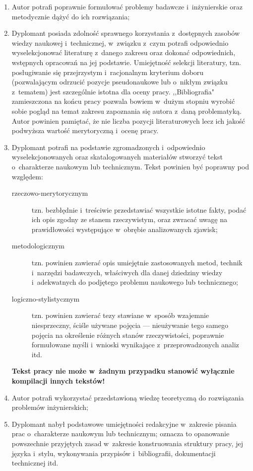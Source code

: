 \documentclass[skorowidz,skroty]{dyplomWEZUT}
\begin{document}
\begin{enumerate}

\item Autor potrafi poprawnie formułować problemy badawcze i~inżynierskie oraz metodycznie dążyć do ich rozwiązania;

\item Dyplomant posiada zdolność sprawnego korzystania z~dostępnych zasobów wiedzy naukowej i~technicznej, w~związku z~czym potrafi odpowiednio wyselekcjonować literaturę z~danego zakresu oraz dokonać odpowiednich, wstępnych opracowań na jej podstawie. Umiejętność selekcji literatury, tzn. posługiwanie się przejrzystym i~racjonalnym kryterium doboru (pozwalającym odrzucić pozycje pseudonaukowe lub o~nikłym związku
z~tematem) jest szczególnie istotna dla oceny pracy. ,,Bibliografia" zamieszczona na końcu pracy pozwala bowiem w~dużym stopniu wyrobić sobie pogląd na temat zakresu zapoznania się autora z~daną problematyką. Autor powinien pamiętać, że nie liczba pozycji literaturowych lecz ich jakość podwyższa wartość merytoryczną i~ocenę pracy.

\item Dyplomant potrafi na podstawie zgromadzonych i~odpowiednio wyselekcjonowanych oraz skatalogowanych materiałów stworzyć tekst o~charakterze naukowym lub technicznym. Tekst powinien być poprawny pod względem:

\begin{description}
\item[rzeczowo-merytorycznym] tzn. bezbłędnie i~treściwie przedstawiać wszystkie istotne fakty, podać ich opis zgodny ze stanem rzeczywistym, oraz zwracać uwagę na prawidłowości występujące w~obrębie analizowanych zjawisk;
\item[metodologicznym] tzn. powinien zawierać opis umiejętnie zastosowanych metod, technik i~narzędzi badawczych, właściwych dla danej dziedziny wiedzy i~adekwatnych do podjętego problemu naukowego lub technicznego;
\item[logiczno-stylistycznym] tzn. powinien zawierać tezy stawiane w~sposób wzajemnie niesprzeczny, ściśle używane pojęcia --- nieużywanie tego samego pojęcia na określenie różnych stanów rzeczywistości, poprawnie formułowane myśli i~wnioski wynikające z~przeprowadzonych analiz itd.
\end{description}

\textbf{Tekst pracy nie może w~żadnym przypadku stanowić wyłącznie kompilacji innych tekstów!}

\item Autor potrafi wykorzystać przedstawioną wiedzę teoretyczną do rozwiązania problemów inżynierskich;

\item Dyplomant nabył podstawowe umiejętności redakcyjne w~zakresie pisania prac o~charakterze naukowym lub technicznym; oznacza to opanowanie powszechnie przyjętych zasad w~zakresie konstruowania struktury pracy, jej języka i~stylu, wykonywania przypisów i~bibliografii, dokumentacji technicznej itd.

\end{enumerate}
\end{document}
